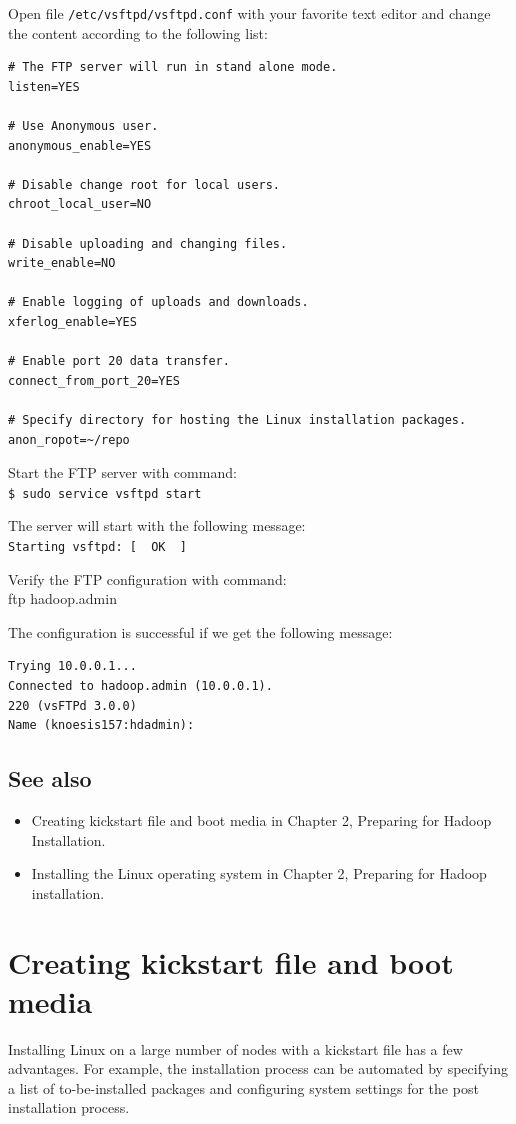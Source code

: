 Open file \verb|/etc/vsftpd/vsftpd.conf| with your favorite text editor and change the content according to the following list:
\begin{verbatim}
# The FTP server will run in stand alone mode.
listen=YES

# Use Anonymous user.
anonymous_enable=YES

# Disable change root for local users.
chroot_local_user=NO

# Disable uploading and changing files.
write_enable=NO

# Enable logging of uploads and downloads.
xferlog_enable=YES

# Enable port 20 data transfer.
connect_from_port_20=YES

# Specify directory for hosting the Linux installation packages.
anon_ropot=~/repo
\end{verbatim}

Start the FTP server with command: \\
\verb|$ sudo service vsftpd start|

The server will start with the following message: \\
\verb|Starting vsftpd: [  OK  ]|

Verify the FTP configuration with command: \\
ftp hadoop.admin

The configuration is successful if we get the following message:
\begin{verbatim}
Trying 10.0.0.1...
Connected to hadoop.admin (10.0.0.1).
220 (vsFTPd 3.0.0)
Name (knoesis157:hdadmin):
\end{verbatim}

\subsection*{See also}
\begin{itemize}
  \item Creating kickstart file and boot media in Chapter 2, Preparing for Hadoop Installation.
  \item Installing the Linux operating system in Chapter 2, Preparing for Hadoop installation.
\end{itemize}

\section{Creating kickstart file and boot media}
Installing Linux on a large number of nodes with a kickstart file has a few advantages. For example, the installation process can be automated by specifying a list of to-be-installed packages and configuring system settings for the post installation process.

